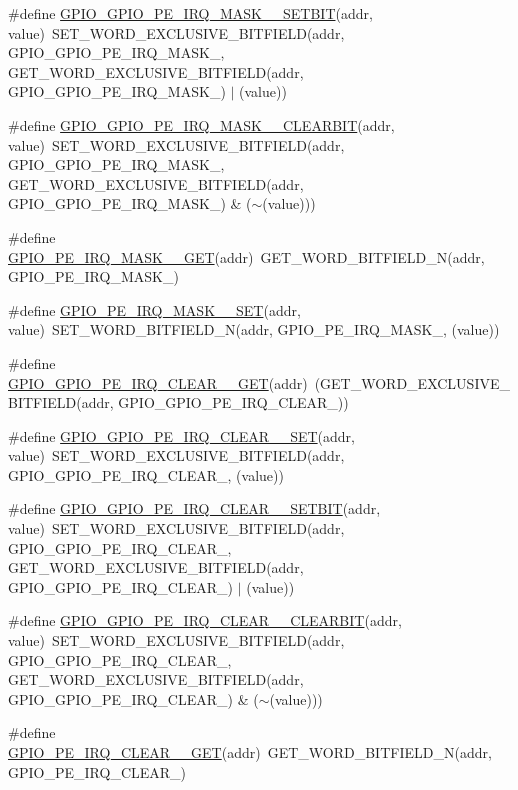 \begin{DoxyCompactItemize}
\item 
\#define \hyperlink{a00554_ad2ba5f93ec54cf0dc29f082369f34261}{GPIO\_\-GPIO\_\-PE\_\-IRQ\_\-MASK\_\_\-SETBIT}(addr, value)~SET\_\-WORD\_\-EXCLUSIVE\_\-BITFIELD(addr, GPIO\_\-GPIO\_\-PE\_\-IRQ\_\-MASK\_, GET\_\-WORD\_\-EXCLUSIVE\_\-BITFIELD(addr, GPIO\_\-GPIO\_\-PE\_\-IRQ\_\-MASK\_) $|$ (value))
\item 
\#define \hyperlink{a00554_a1b5830f1db8ba9581699a569dcf4fc9b}{GPIO\_\-GPIO\_\-PE\_\-IRQ\_\-MASK\_\_\-CLEARBIT}(addr, value)~SET\_\-WORD\_\-EXCLUSIVE\_\-BITFIELD(addr, GPIO\_\-GPIO\_\-PE\_\-IRQ\_\-MASK\_, GET\_\-WORD\_\-EXCLUSIVE\_\-BITFIELD(addr, GPIO\_\-GPIO\_\-PE\_\-IRQ\_\-MASK\_) \& ($\sim$(value)))
\item 
\#define \hyperlink{a00554_ac8d577caade6b590b78dc59eba810ed3}{GPIO\_\-PE\_\-IRQ\_\-MASK\_\_\-GET}(addr)~GET\_\-WORD\_\-BITFIELD\_\-N(addr, GPIO\_\-PE\_\-IRQ\_\-MASK\_)
\item 
\#define \hyperlink{a00554_abaf2ab7fd540de1bc3ec9508899bfb90}{GPIO\_\-PE\_\-IRQ\_\-MASK\_\_\-SET}(addr, value)~SET\_\-WORD\_\-BITFIELD\_\-N(addr, GPIO\_\-PE\_\-IRQ\_\-MASK\_, (value))
\item 
\#define \hyperlink{a00554_a31ca7da8d159c282b610ca047125a7b9}{GPIO\_\-GPIO\_\-PE\_\-IRQ\_\-CLEAR\_\_\-GET}(addr)~(GET\_\-WORD\_\-EXCLUSIVE\_\-BITFIELD(addr, GPIO\_\-GPIO\_\-PE\_\-IRQ\_\-CLEAR\_))
\item 
\#define \hyperlink{a00554_a28a0a3406221bac0c761ce61b4f7a3e0}{GPIO\_\-GPIO\_\-PE\_\-IRQ\_\-CLEAR\_\_\-SET}(addr, value)~SET\_\-WORD\_\-EXCLUSIVE\_\-BITFIELD(addr, GPIO\_\-GPIO\_\-PE\_\-IRQ\_\-CLEAR\_, (value))
\item 
\#define \hyperlink{a00554_a00917ba606599b07ec2fc127081d6c34}{GPIO\_\-GPIO\_\-PE\_\-IRQ\_\-CLEAR\_\_\-SETBIT}(addr, value)~SET\_\-WORD\_\-EXCLUSIVE\_\-BITFIELD(addr, GPIO\_\-GPIO\_\-PE\_\-IRQ\_\-CLEAR\_, GET\_\-WORD\_\-EXCLUSIVE\_\-BITFIELD(addr, GPIO\_\-GPIO\_\-PE\_\-IRQ\_\-CLEAR\_) $|$ (value))
\item 
\#define \hyperlink{a00554_ac0cb9eaab0b67c4cbd56699fc290ff58}{GPIO\_\-GPIO\_\-PE\_\-IRQ\_\-CLEAR\_\_\-CLEARBIT}(addr, value)~SET\_\-WORD\_\-EXCLUSIVE\_\-BITFIELD(addr, GPIO\_\-GPIO\_\-PE\_\-IRQ\_\-CLEAR\_, GET\_\-WORD\_\-EXCLUSIVE\_\-BITFIELD(addr, GPIO\_\-GPIO\_\-PE\_\-IRQ\_\-CLEAR\_) \& ($\sim$(value)))
\item 
\#define \hyperlink{a00554_a753163624f1c875b2020fe2e1dcab43e}{GPIO\_\-PE\_\-IRQ\_\-CLEAR\_\_\-GET}(addr)~GET\_\-WORD\_\-BITFIELD\_\-N(addr, GPIO\_\-PE\_\-IRQ\_\-CLEAR\_)

\end{DoxyCompactItemize}
